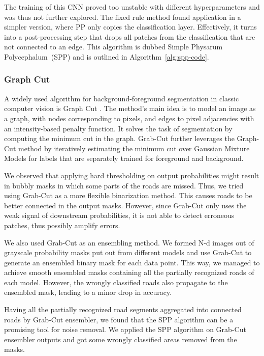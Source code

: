     The training of this CNN proved too unstable with different hyperparameters and was thus not further explored.
    The fixed rule method found application in a simpler version, where PP only copies the classification layer.
    Effectively, it turns into a post-processing step that drops all patches from the classification that are not connected to an edge.
    This algorithm is dubbed Simple Physarum Polycephalum~(SPP) and is outlined in Algorithm~\ref{alg:spp-code}.

    \subsubsection{Graph Cut}
    A widely used algorithm for background-foreground segmentation in classic computer vision is Graph Cut \cite{graphcut}. 
    The method's main idea is to model an image as a graph, with nodes corresponding to pixels, and edges to pixel adjacencies with an intensity-based penalty function.
    It solves the task of segmentation by computing the minimum cut in the graph.
    Grab-Cut \cite{grabcut} further leverages the Graph-Cut method by iteratively estimating the minimum cut over Gaussian Mixture Models for labels that are separately trained for foreground and background.
    
    We observed that applying hard thresholding on output probabilities might result in bubbly masks in which some parts of the roads are missed. Thus, we tried using Grab-Cut as a more flexible binarization method. This causes roads to be better connected in the output masks. However, since Grab-Cut only uses the weak signal of downstream probabilities, it is not able to detect erroneous patches, thus possibly amplify errors.
    
    We also used Grab-Cut as an ensembling method. We formed N-d images out of grayscale probability masks put out from different models and use Grab-Cut to generate an ensembled binary mask for each data point. This way, we managed to achieve smooth ensembled masks containing all the partially recognized roads of each model. However, the wrongly classified roads also propagate to the ensembled mask, leading to a minor drop in accuracy.
    
    Having all the partially recognized road segments aggregated into connected roads by Grab-Cut ensembler, we found that the SPP algorithm can be a promising tool for noise removal. We applied the SPP algorithm on Grab-Cut ensembler outputs and got some wrongly classified areas removed from the masks. 

